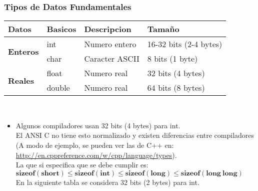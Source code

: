 \documentclass[letterpaper]{report}
\begin{document}
\subsubsection*{Tipos de Datos Fundamentales}
\begin{tabular}{|l|l|l|l|}
  \hline \textbf{Datos} &  \textbf{Basicos} & \textbf{Descripcion} & \textbf{Tamaño}\\
  \hline\multirow{2}{*}{\textbf{Enteros}} & int & Numero entero & 16-32 bits (2-4 bytes)\\
   \cline{2-4} & char & Caracter ASCII & 8 bits (1 byte) \\
  \hline\multirow{2}{*}{\textbf{Reales}} & float & Numero real & 32 bits (4 bytes) \\
   \cline{2-4} & double & Numero real & 64 bits (8 bytes)\\
  \hline
\end{tabular} \\
\begin{itemize}
\item Algunos compiladores usan 32 bits (4 bytes) para int.\\ El ANSI C no tiene esto normalizado y existen diferencias entre compiladores (A modo de ejemplo, se pueden ver las de C++ en: \url{http://en.cppreference.com/w/cpp/language/types}).\\
La que si especifica que se debe cumplir es:\\ $\mathbf{sizeof(short) \leq sizeof(int) \leq sizeof(long) \leq sizeof(long\ long)}$\\
En la siguiente tabla se considera 32 bits (2 bytes) para int.
\end{itemize}
\end{document}
